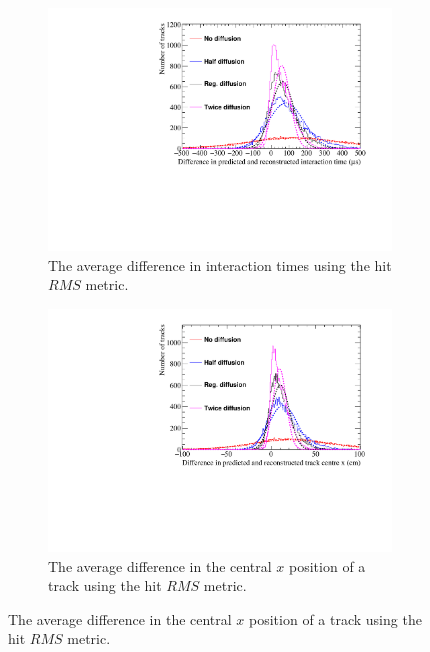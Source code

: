 
\begin{figure}
  \centering
  \begin{subfigure}{0.6\textwidth}
    \centering
    \includegraphics[width=\textwidth]{Canvas_AvDiff_T_RMS_Diffusion}
    \caption{The average difference in interaction times using the hit $RMS$ metric.}
    \label{fig:DiffLDiff_AvDiffRMS_T}
  \end{subfigure}
  \begin{subfigure}{0.6\textwidth}
    \centering
    \includegraphics[width=\textwidth]{Canvas_AvDiff_X_RMS_Diffusion}
    \caption{The average difference in the central $x$ position of a track using the hit $RMS$ metric.}
    \label{fig:DiffLDiff_AvDiffRMS_X}
  \end{subfigure}

\end{figure}
